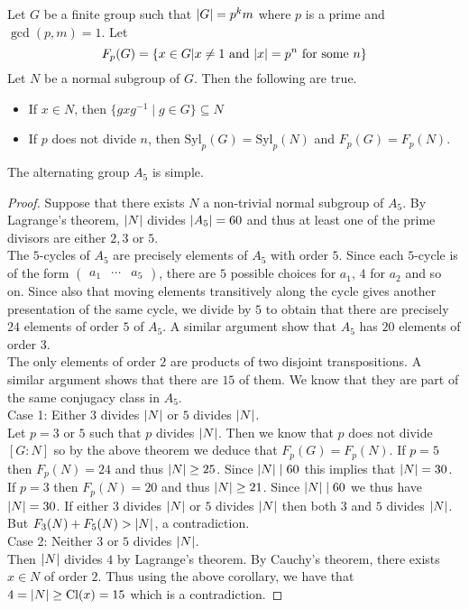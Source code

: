 \documentclass[a4paper]{article}
\begin{document}
\begin{lmm}{}{} Let $G$ be a finite group such that $\abs{G}=p^km$ where $p$ is a prime and $\gcd(p,m)=1$. Let $$F_p(G)=\{x\in G|x\neq 1\text{ and }\abs{x}=p^n\text{ for some }n\}$$ Let $N$ be a normal subgroup of $G$. Then the following are true. 
\begin{itemize}
\item If $x\in N$, then $\{gxg^{-1}\;|\;g\in G\}\subseteq N$
\item If $p$ does not divide $n$, then $\text{Syl}_p(G)=\text{Syl}_p(N)$ and $F_p(G)=F_p(N)$. 
\end{itemize}
\end{lmm}

\begin{prp}{}{} The alternating group $A_5$ is simple. 
\begin{proof}
Suppose that there exists $N$ a non-trivial normal subgroup of $A_5$. By Lagrange's theorem, $\abs{N}$ divides $\abs{A_5}=60$ and thus at least one of the prime divisors are either $2,3$ or $5$. \\
The $5$-cycles of $A_5$ are precisely elements of $A_5$ with order $5$. Since each $5$-cycle is of the form $\begin{pmatrix} a_1 & \cdots & a_5\end{pmatrix}$, there are $5$ possible choices for $a_1$, $4$ for $a_2$ and so on. Since also that moving elements transitively along the cycle gives another presentation of the same cycle, we divide by $5$ to obtain that there are precisely $24$ elements of order $5$ of $A_5$. A similar argument show that $A_5$ has $20$ elements of order $3$. \\

The only elements of order $2$ are products of two disjoint transpositions. A similar argument shows that there are $15$ of them. We know that they are part of the same conjugacy class in $A_5$. \\

Case 1: Either $3$ divides $\abs{N}$ or $5$ divides $\abs{N}$. \\
Let $p=3$ or $5$ such that $p$ divides $\abs{N}$. Then we know that $p$ does not divide $[G:N]$ so by the above theorem we deduce that $F_p(G)=F_p(N)$. If $p=5$ then $F_p(N)=24$ and thus $\abs{N}\geq 25$. Since $\abs{N}\;|\;60$ this implies that $\abs{N}=30$. If $p=3$ then $F_p(N)=20$ and thus $\abs{N}\geq 21$. Since $\abs{N}\;|\;60$ we thus have $\abs{N}=30$. If either $3$ divides $\abs{N}$ or $5$ divides $\abs{N}$ then both $3$ and $5$ divides $\abs{N}$. But $F_3(N)+F_5(N)>\abs{N}$, a contradiction. \\

Case 2: Neither $3$ or $5$ divides $\abs{N}$. \\
Then $\abs{N}$ divides $4$ by Lagrange's theorem. By Cauchy's theorem, there exists $x\in N$ of order $2$. Thus using the above corollary, we have that $4=\abs{N}\geq\text{Cl}(x)=15$ which is a contradiction. 
\end{proof}
\end{prp}
\end{document}
